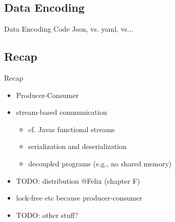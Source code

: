 \subsection{Data Encoding}
\begin{frame}{Data Encoding}
      Code Json, vs. yaml, vs...
\end{frame}


\subsection{Recap} %
\begin{frame}{Recap}
   \begin{itemize}[<+(1)->]
      \itemsep12pt
      \item Producer-Consumer
      \item stream-based communication \begin{itemize}
         \item cf. Javas functional streams
         \item serialization and deserialization %
         \item decoupled programs (e.g., no shared memory)
      \end{itemize}
      \item TODO: distribution @Felix (chapter F)
      \item lock-free etc because producer-consumer
      \item TODO: other stuff?
   \end{itemize}
\end{frame}


